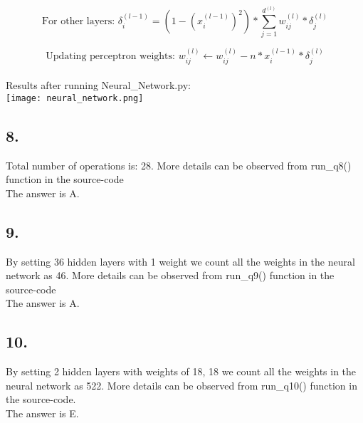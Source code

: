 \documentclass{homework}
\begin{document}
\[\text{For other layers: } \delta_i^{(l - 1)} = (1 - (x_i^{(l - 1)})^2) * \sum_{j = 1}^{d^{(l)}} w_{ij}^{(l)}* \delta_j^{(l)}\]

\[\text{Updating perceptron weights: } w_{ij}^{(l)} \leftarrow w_{ij}^{(l)} - n*x_i^{(l - 1)} * \delta_j^{(l)}\] \\

Results after running Neural\_Network.py:\\
\texttt{[image: neural\_network.png]}\\

\subsection*{8.} 
Total number of operations is: 28. More details can be observed from run_q8() function in the source-code \\
The answer is A.
\subsection*{9.} 
By setting 36 hidden layers with 1 weight we count all the weights in the neural network
as 46. More details can be observed from run_q9() function in the source-code \\
The answer is A.
\subsection*{10.} 
By setting 2 hidden layers with weights of 18, 18 we count all the weights in the neural network as 522. More details can be observed from run_q10() function in the source-code.\\ 
The answer is E.
\end{document}
